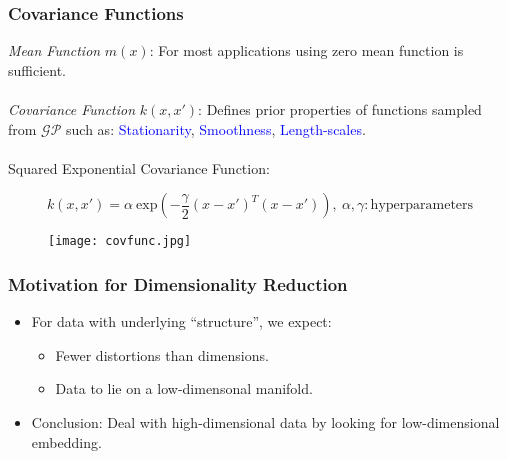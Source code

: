 \documentclass[10pt,handout]{beamer}
\begin{document}
\begin{frame}
\frametitle{Covariance Functions}

\emph{Mean Function} $m(x)$: For most applications using zero mean function is sufficient.\\~\\

\emph{Covariance Function} $k(x,x')$: Defines prior properties of functions sampled from $\mathcal{GP}$ such as: \textcolor{blue}{Stationarity}, \textcolor{blue}{Smoothness}, \textcolor{blue}{Length-scales}.\\~\\

Squared Exponential Covariance Function: 

\begin{equation}
  k(x,x')  = \alpha~\text{exp} \left( - \frac{\gamma}{2} (x - x')^T(x - x') \right),~\alpha,\gamma: \text{hyperparameters}
\end{equation}

\begin{figure}
  \centering
  \texttt{[image: covfunc.jpg]}
\end{figure}

\end{frame}

\begin{frame}
\frametitle{Motivation for Dimensionality Reduction}

\begin{itemize}
  \item For data with underlying ``structure'', we expect:
    \begin{itemize}
      \item Fewer distortions than dimensions.
      \item Data to lie on a low-dimensonal manifold.
    \end{itemize}
  \item Conclusion: Deal with high-dimensional data by looking for low-dimensional embedding.
\end{itemize}

\end{frame}
\end{document}
